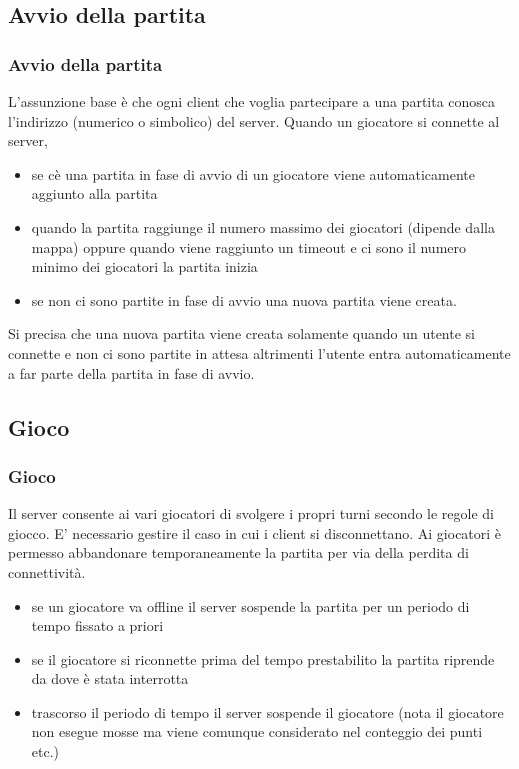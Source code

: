 \documentclass{beamer}
\begin{document}
\subsection{Avvio della partita}
\begin{frame}
\frametitle{Avvio della partita}
L'assunzione base \`e che ogni client che voglia partecipare a una partita conosca l'indirizzo (numerico o simbolico) del server. Quando un giocatore si connette al server, 
\begin{itemize}
\item se c\`e una partita in fase di avvio di un giocatore viene
  automaticamente aggiunto alla partita
\item quando la partita raggiunge il numero massimo dei giocatori
  (dipende dalla mappa) oppure quando viene raggiunto un timeout  e ci
  sono il numero minimo dei giocatori la partita inizia 
\item se non ci sono partite in fase di avvio una nuova partita viene
  creata.
\end{itemize}
Si precisa che una nuova partita viene creata solamente quando un
utente si connette e non ci sono partite in attesa altrimenti l'utente
entra automaticamente a far parte della partita in fase di avvio.
\end{frame}

\subsection{Gioco}
\begin{frame}
\frametitle{Gioco}
Il server consente ai vari giocatori di svolgere i propri turni
secondo le regole di giocco. E' necessario gestire il caso in cui i
client si disconnettano. Ai giocatori \`e permesso abbandonare
temporaneamente la partita per via della perdita di connettivit\`a.
\begin{itemize}
\item se un giocatore va offline il server sospende la partita per un periodo di tempo fissato a priori
\item se il giocatore si riconnette prima del tempo prestabilito la partita riprende da dove \`e stata interrotta
\item trascorso il periodo di tempo il server sospende il giocatore (nota il giocatore non esegue mosse ma viene comunque considerato nel conteggio dei punti etc.)
\end{itemize}
\end{frame}
\end{document}
